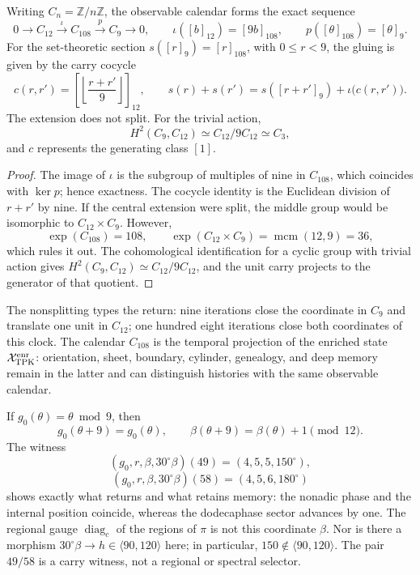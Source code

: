 \begin{proposition}
\label{prop:extension-central-108-no-escindida-rev8}
Writing \(C_n=\mathbb Z/n\mathbb Z\), the observable calendar forms the exact
sequence
\[
 0\longrightarrow C_{12}
 \xrightarrow{\ \iota\ }C_{108}
 \xrightarrow{\ p\ }C_9
 \longrightarrow0,
 \qquad
 \iota([b]_{12})=[9b]_{108},\qquad
 p([\theta]_{108})=[\theta]_9.
\]
For the set-theoretic section \(s([r]_9)=[r]_{108}\), with
\(0\leq r<9\), the gluing is given by the carry cocycle
\[
 c(r,r')=
 \left[\left\lfloor\frac{r+r'}{9}\right\rfloor\right]_{12},
 \qquad
 s(r)+s(r')=s([r+r']_9)+\iota\bigl(c(r,r')\bigr).
\]
The extension does not split. For the trivial action,
\[
 H^2(C_9,C_{12})
 \simeq C_{12}/9C_{12}
 \simeq C_3,
\]
and \(c\) represents the generating class \([1]\).
\end{proposition}

\begin{proof}
The image of \(\iota\) is the subgroup of multiples of nine in
\(C_{108}\), which coincides with \(\ker p\); hence exactness. The cocycle
identity is the Euclidean division of \(r+r'\) by nine. If the central extension
were split, the middle group would be isomorphic to
\(C_{12}\times C_9\). However,
\[
 \exp(C_{108})=108,\qquad
 \exp(C_{12}\times C_9)=\operatorname{mcm}(12,9)=36,
\]
which rules it out. The cohomological identification for a cyclic group with
trivial action gives \(H^2(C_9,C_{12})\simeq C_{12}/9C_{12}\), and the unit
carry projects to the generator of that quotient.
\end{proof}

The nonsplitting types the return: nine iterations close the coordinate in
\(C_9\) and translate one unit in \(C_{12}\); one hundred eight iterations close both
coordinates of this clock. The calendar \(C_{108}\) is the temporal
projection of the enriched state \(\mathcal X_{\rm TPK}^{\rm enr}\):
orientation, sheet, boundary, cylinder, genealogy, and deep memory
remain in the latter and can
distinguish histories with the same observable calendar.

If \(g_0(\theta)=\theta\bmod9\), then
\[
 g_0(\theta+9)=g_0(\theta),\qquad
 \beta(\theta+9)=\beta(\theta)+1\pmod{12}.
\]
The witness
\[
 (g_0,r,\beta,30^\circ\beta)(49)=(4,5,5,150^\circ),
\]
\[
 (g_0,r,\beta,30^\circ\beta)(58)=(4,5,6,180^\circ)
\]
shows exactly what returns and what retains memory: the nonadic phase and the internal position coincide, whereas the dodecaphase sector advances by one. The regional gauge \(\operatorname{diag}_c\) of the regions of \(\pi\) is not this coordinate \(\beta\). Nor is there a morphism \(30^\circ\beta\to h\in\langle90,120\rangle\) here; in particular, \(150\notin\langle90,120\rangle\). The pair \(49/58\) is a carry witness, not a regional or spectral selector.


